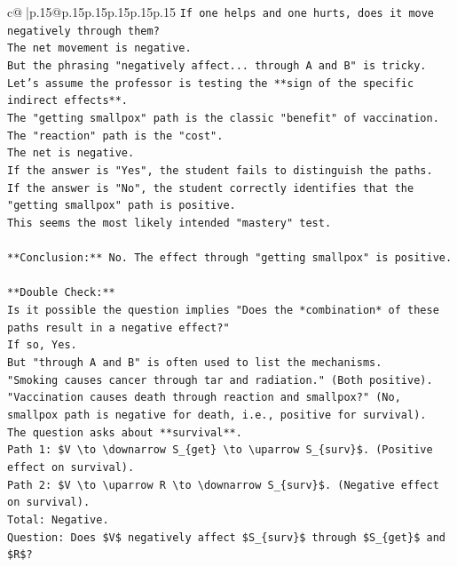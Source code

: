\documentclass{article}
\begin{document}
{\begin{supertabular}{c@{$\;$}|p{.15\linewidth}@{}p{.15\linewidth}p{.15\linewidth}p{.15\linewidth}p{.15\linewidth}p{.15\linewidth}}
{{{\texttt{If one helps and one hurts, does it move negatively through them?} \\
\texttt{The net movement is negative.} \\
\texttt{But the phrasing "negatively affect... through A and B" is tricky.} \\
\texttt{Let's assume the professor is testing the **sign of the specific indirect effects**.} \\
\texttt{The "getting smallpox" path is the classic "benefit" of vaccination.} \\
\texttt{The "reaction" path is the "cost".} \\
\texttt{The net is negative.} \\
\texttt{If the answer is "Yes", the student fails to distinguish the paths.} \\
\texttt{If the answer is "No", the student correctly identifies that the "getting smallpox" path is positive.} \\
\texttt{This seems the most likely intended "mastery" test.} \\
\\ 
\texttt{**Conclusion:** No. The effect through "getting smallpox" is positive.} \\
\\ 
\texttt{**Double Check:**} \\
\texttt{Is it possible the question implies "Does the *combination* of these paths result in a negative effect?"} \\
\texttt{If so, Yes.} \\
\texttt{But "through A and B" is often used to list the mechanisms.} \\
\texttt{"Smoking causes cancer through tar and radiation." (Both positive).} \\
\texttt{"Vaccination causes death through reaction and smallpox?" (No, smallpox path is negative for death, i.e., positive for survival).} \\
\texttt{The question asks about **survival**.} \\
\texttt{Path 1: \$V \textbackslash{}to \textbackslash{}downarrow S\_\{get\} \textbackslash{}to \textbackslash{}uparrow S\_\{surv\}\$. (Positive effect on survival).} \\
\texttt{Path 2: \$V \textbackslash{}to \textbackslash{}uparrow R \textbackslash{}to \textbackslash{}downarrow S\_\{surv\}\$. (Negative effect on survival).} \\
\texttt{Total: Negative.} \\
\texttt{Question: Does \$V\$ negatively affect \$S\_\{surv\}\$ through \$S\_\{get\}\$ and \$R\$?} \\
}}}
\end{supertabular}}
\end{document}
